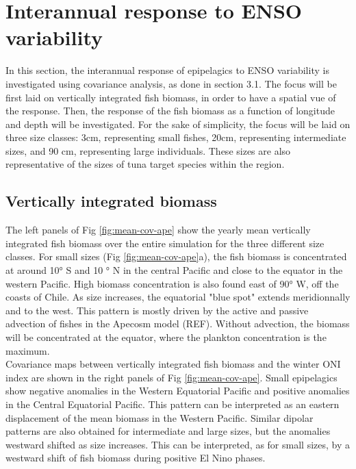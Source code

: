 \section{Interannual response to ENSO variability}

In this section, the interannual response of epipelagics to ENSO variability is investigated using covariance analysis, as done in section 3.1. The focus will be first laid on vertically integrated fish biomass, in order to have a spatial vue of the response. Then, the response of the fish biomass as a function of longitude and depth will be investigated.
For the sake of simplicity, the focus will be laid on three size classes: 3cm, representing small fishes, 20cm, representing intermediate sizes, and 90 cm, representing large individuals. These sizes are also representative of the sizes of tuna target species within the region.\\

\subsection{Vertically integrated biomass}

The left panels of Fig \ref{fig:mean-cov-ape} show the yearly mean vertically integrated fish biomass over the entire simulation for the three different size classes. For small sizes (Fig \ref{fig:mean-cov-ape}a), the fish biomass is concentrated at around 10° S and 10 ° N in the central Pacific and close to the equator in the western Pacific. High biomass concentration is also found east of 90° W, off the coasts of Chile. As size increases, the equatorial "blue spot" extends meridionnally and to the west. This pattern is mostly driven by the active and passive advection of fishes in the Apecosm model (REF). Without advection, the biomass will be concentrated at the equator, where the plankton concentration is the maximum.\\

Covariance maps between vertically integrated fish biomass and the winter ONI index are shown in the right panels of  Fig \ref{fig:mean-cov-ape}.
Small epipelagics show negative anomalies in the Western Equatorial Pacific and positive anomalies in the Central Equatorial Pacific. This pattern can be interpreted as an eastern displacement of the mean biomass in the Western Pacific.
Similar dipolar patterns are also obtained for intermediate and large sizes, but the anomalies westward shifted as size increases. This can be interpreted, as for small sizes, by a westward shift of fish biomass during positive El Nino phases.\\

